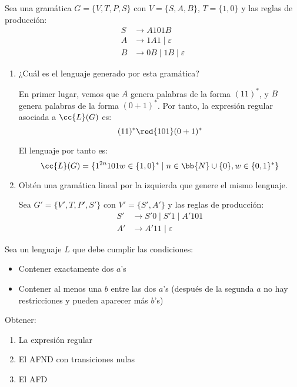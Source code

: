 \documentclass[12pt]{article}
\begin{document}
\begin{ejercicio}
    Sea una gramática $G=\{V,T,P,S\}$ con $V=\{S,A,B\}$, $T=\{1,0\}$ y las reglas de producción:
    \begin{align*}
        S & \rightarrow A101B \\
        A & \rightarrow 1A1\mid \varepsilon \\
        B & \rightarrow 0B \mid 1B\mid \varepsilon
    \end{align*}
    \begin{enumerate}
        \item ¿Cuál es el lenguaje generado por esta gramática?
        
        En primer lugar, vemos que $A$ genera palabras de la forma $(11)^*$, y $B$ genera palabras de la forma $(0+1)^*$. Por tanto, la expresión regular asociada a $\cc{L}(G)$ es:
        \begin{equation*}
            (11)^*\red{101}(0+1)^*
        \end{equation*}

        El lenguaje por tanto es:
        \begin{equation*}
            \cc{L}(G) = \{1^{2n}101w\in \{1,0\}^*\mid n\in \bb{N}\cup \{0\}, w\in\{0,1\}^*\}
        \end{equation*}

        \item Obtén una gramática lineal por la izquierda que genere el mismo lenguaje.
        
        Sea $G'= \{V',T,P',S'\}$ con $V'=\{S',A'\}$ y las reglas de producción:
        \begin{align*}
            S' & \rightarrow S'0 \mid S'1 \mid A'101 \\
            A' & \rightarrow A'11 \mid \varepsilon
        \end{align*}
    \end{enumerate}
\end{ejercicio}

\begin{ejercicio}
    Sea un lenguaje $L$ que debe cumplir las condiciones:
    \begin{itemize}
        \item Contener exactamente dos $a$'s
        \item Contener al menos una $b$ entre las dos $a$'s (después de la segunda $a$ no hay restricciones y pueden aparecer más $b$'s)
    \end{itemize}
    Obtener:
    \begin{enumerate}
        \item La expresión regular
        \item El AFND con transiciones nulas
        \item El AFD
    \end{enumerate}
\end{ejercicio}
\end{document}

